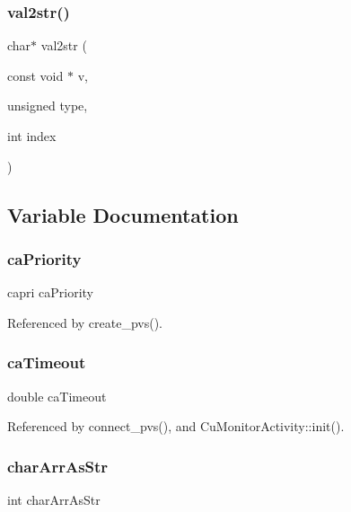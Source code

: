 \subsubsection{val2str()}
{\footnotesize\ttfamily char$\ast$ val2str (\begin{DoxyParamCaption}\item[{const void $\ast$}]{v,  }\item[{unsigned}]{type,  }\item[{int}]{index }\end{DoxyParamCaption})}



\subsection{Variable Documentation}
\mbox{\label{cuepics-world_8h_acd49e1150b00929469c7ee6045c317bf}} 
\subsubsection{ca\+Priority}
{\footnotesize\ttfamily capri ca\+Priority}



Referenced by create\+\_\+pvs().

\mbox{\label{cuepics-world_8h_a849d8602b082fe2275cc6c6c7ad40a36}} 
\subsubsection{ca\+Timeout}
{\footnotesize\ttfamily double ca\+Timeout}



Referenced by connect\+\_\+pvs(), and Cu\+Monitor\+Activity\+::init().

\mbox{\label{cuepics-world_8h_ab815500b3a67737b1515e93ead71be9a}} 
\subsubsection{char\+Arr\+As\+Str}
{\footnotesize\ttfamily int char\+Arr\+As\+Str}

